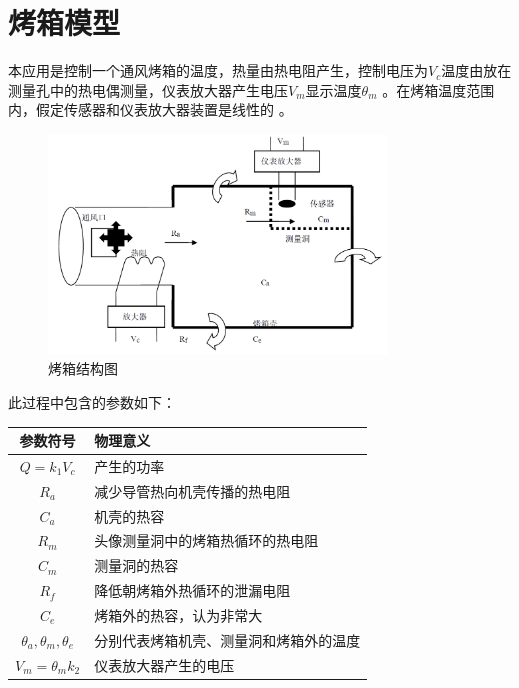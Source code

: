 \documentclass[11pt]{article}
\begin{document}
\newpage

\setcounter{tocdepth}{3}
\tableofcontents
\newpage

\setcounter{page}{1}
\section{烤箱模型}
本应用是控制一个通风烤箱的温度，热量由热电阻产生，控制电压为$V_c$温度由放在测量孔中的热电偶测量，仪表放大器产生电压$V_m $显示温度$ \theta_m$ 。在烤箱温度范围内，假定传感器和仪表放大器装置是线性的 。
\begin{figure}[H]
  \centering
  \includegraphics[width=0.8\textwidth]{烤箱结构图.png}
  \caption{烤箱结构图}
  \label{fig:烤箱结构图}
\end{figure}
此过程中包含的参数如下：
\begin{table}[H]
  \centering
  \renewcommand{\arraystretch}{1.5}
  \begin{tabular}{c|l}
    \hline
    参数符号                         & 物理意义                \\
    \hline
    $Q=k_1V_c$                   & 产生的功率               \\
    $R_a$                        & 减少导管热向机壳传播的热电阻      \\
    $C_a$                        & 机壳的热容               \\
    $R_m$                        & 头像测量洞中的烤箱热循环的热电阻    \\
    $C_m$                        & 测量洞的热容              \\
    $R_f$                        & 降低朝烤箱外热循环的泄漏电阻      \\
    $C_e$                        & 烤箱外的热容，认为非常大        \\
    $\theta_a,\theta_m,\theta_e$ & 分别代表烤箱机壳、测量洞和烤箱外的温度 \\
    $V_m=\theta_mk_2$            & 仪表放大器产生的电压          \\
    \hline
  \end{tabular}
\end{table}
\end{document}
